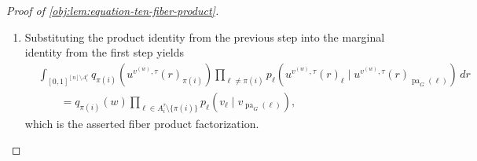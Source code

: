 \begin{proof}[Proof of \cref{obj:lem:equation-ten-fiber-product}]
\begin{enumerate}
\item Substituting the product identity from the previous step into the marginal identity from the first step yields
\[
\begin{aligned}
&\int_{[0,1]^{[n]\setminus A_i^\tau}}
q_{\pi(i)}\!\left(u^{v^{(w)},\tau}(r)_{\pi(i)}\right)
\prod_{\ell\ne\pi(i)}
p_\ell\!\left(u^{v^{(w)},\tau}(r)_\ell\mid
u^{v^{(w)},\tau}(r)_{\operatorname{pa}_G(\ell)}\right)\,dr\\
&\qquad =
q_{\pi(i)}(w)
\prod_{\ell\in A_i^\tau\setminus\{\pi(i)\}}
p_\ell\!\left(v_\ell\mid v_{\operatorname{pa}_G(\ell)}\right),
\end{aligned}
\]
which is the asserted fiber product factorization. %
\end{enumerate}
\end{proof}
